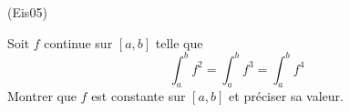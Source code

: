 \begin{tiny}(Eis05)\end{tiny}
Soit $f$ continue sur $\left[ a,b\right] $ telle que
\begin{displaymath}
\int_{a}^{b}f^{2}=\int_{a}^{b}f^{3}=\int_{a}^{b}f^{4} 
\end{displaymath}
Montrer que $f$ est constante sur $\left[ a,b\right]$ et préciser sa valeur.
